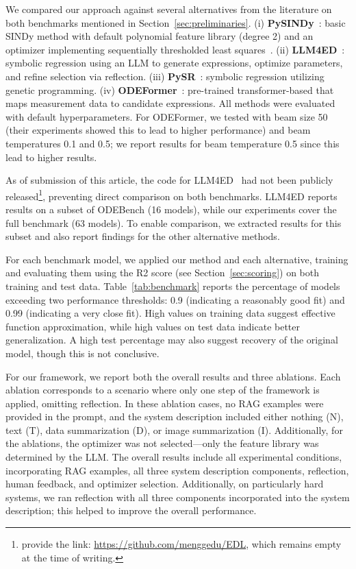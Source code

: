 \documentclass{article}
\begin{document}
We compared our approach against several alternatives from the literature on both benchmarks mentioned in Section~\ref{sec:preliminaries}. 
(i) \textbf{PySINDy}~\cite{deSilva2020}: basic SINDy method with default polynomial feature library (degree 2) and an optimizer implementing sequentially thresholded least squares~\cite{Brunton2016}.  
(ii) \textbf{LLM4ED}~\cite{Mengge24}: symbolic regression using an LLM to generate expressions, optimize parameters, and refine selection via reflection.  
(iii) \textbf{PySR}~\cite{Cranmer23}: symbolic regression utilizing genetic programming.  
(iv) \textbf{ODEFormer}~\cite{ascoli2024odeformer}: pre-trained transformer-based that maps measurement data to candidate expressions.  
All methods were evaluated with default hyperparameters.
For ODEFormer, we tested with beam size 50 (their experiments showed this to lead to higher performance) and beam temperatures 0.1 and 0.5; we report results for beam temperature 0.5 since this lead to higher results.

As of submission of this article, the code for LLM4ED~\cite{Mengge24} had not been publicly released\footnote{\cite{Mengge24} provide the link: \href{https://github.com/menggedu/EDL}{https://github.com/menggedu/EDL}, which remains empty at the time of writing.}, preventing direct comparison on both benchmarks. 
LLM4ED reports results on a subset of ODEBench (16 models), while our experiments cover the full benchmark (63 models). 
To enable comparison, we extracted results for this subset and also report findings for the other alternative methods.

For each benchmark model, we applied our method and each alternative, training and evaluating them using the R2 score (see Section~\ref{sec:scoring}) on both training and test data. 
Table~\ref{tab:benchmark} reports the percentage of models exceeding two performance thresholds: 0.9 (indicating a reasonably good fit) and 0.99 (indicating a very close fit). 
High values on training data suggest effective function approximation, while high values on test data indicate better generalization. 
A high test percentage may also suggest recovery of the original model, though this is not conclusive.

For our framework, we report both the overall results and three ablations. 
Each ablation corresponds to a scenario where only one step of the framework is applied, omitting reflection. 
In these ablation cases, no RAG examples were provided in the prompt, and the system description included either nothing (N), text (T), data summarization (D), or image summarization (I). 
Additionally, for the ablations, the optimizer was not selected—only the feature library was determined by the LLM. 
The overall results include all experimental conditions, incorporating RAG examples, all three system description components, reflection, human feedback, and optimizer selection.
Additionally, on particularly hard systems, we ran reflection with all three components incorporated into the system description; this helped to improve the overall performance.
\end{document}
